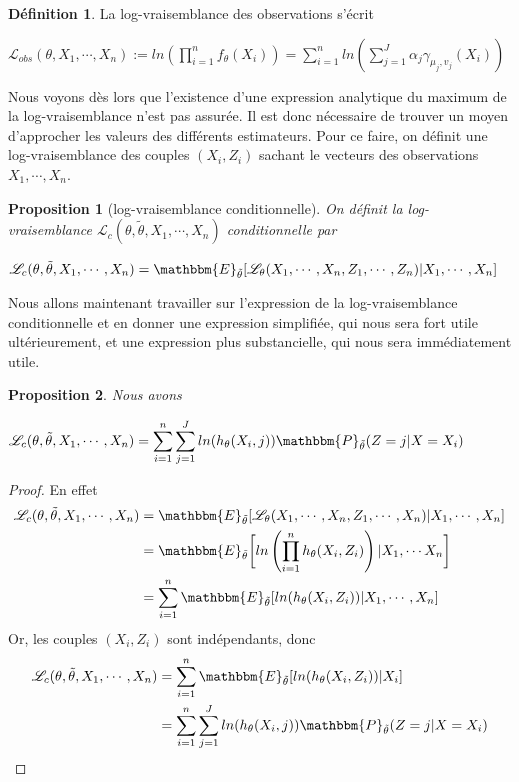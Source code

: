 \documentclass[frenchb]{report}
\newcommand{\1}{\mathbbm{1}}
\newcommand{\E}{\mathbbm{E}}
\newcommand{\prob}{\mathbbm{P}}
\newcommand{\lv}{\mathcal{L}}
\newcommand{\thetat}{\tilde{\theta}}
\newtheorem{prop}{Proposition}
\theoremstyle{definition}\newtheorem{defn}{Définition}
\theoremstyle{definition}\newtheorem{exm}{Exemple}
\theoremstyle{definition}\newtheorem{nota}{Notation}
\theoremstyle{definition}\newtheorem{rem}{Remarque}
\begin{document}
\begin{defn} 
La log-vraisemblance des observations s'écrit 
\begin{center} $\mathcal{L}_{obs}(\theta, X_1, \cdots, X_n) := ln\left( \displaystyle\prod_{i=1}^n f_\theta(X_i) \right) = \displaystyle\sum_{i=1}^nln\left( \sum_{j=1}^J \alpha_j \gamma_{\mu_j, v_j}(X_i) \right)$ \end{center}
\end{defn}

Nous voyons dès lors que l'existence d'une expression analytique du maximum de la log-vraisemblance n'est pas assurée. Il est donc nécessaire de trouver un moyen d'approcher les valeurs des différents estimateurs. \newline
Pour ce faire, on définit une log-vraisemblance des couples $(X_i,Z_i)$ sachant le vecteurs des observations $X_1, \cdots, X_n$.
\begin{prop}[log-vraisemblance conditionnelle]
On définit la log-vraisemblance $\lv_{c}(\theta, \thetat, X_1, \cdots, X_n) $ conditionnelle par
\begin{center} $\lv_{c}(\theta, \thetat, X_1, \cdots, X_n) = \E_{\thetat}[\lv_\theta(X_1, \cdots, X_n, Z_1, \cdots, Z_n) | X_1, \cdots, X_n]$ \end{center}
\end{prop}

Nous allons maintenant travailler sur l'expression de la log-vraisemblance conditionnelle et en donner une expression simplifiée, qui nous sera fort utile ultérieurement, et une expression plus substancielle, qui nous sera immédiatement utile.

\begin{prop}
Nous avons
\begin{center} $\lv_{c}(\theta, \thetat, X_1, \cdots, X_n) = \displaystyle\sum_{i=1}^n\sum_{j=1}^J ln(h_\theta(X_i ,j))  \prob_{\thetat}(Z = j|X = X_i)$ \end{center}
\end{prop}

\begin{proof}
En effet
\begin{align*}
\lv_{c}(\theta, \thetat, X_1, \cdots, X_n) &= \E_{\thetat}[\lv_\theta(X_1, \cdots, X_n, Z_1, \cdots, X_n)|X_1, \cdots, X_n]\\
&=  \E_{\thetat}\bigg[\displaystyle ln\left(\prod_{i=1}^n  h_\theta(X_i,Z_i)\right) |X_1, \cdots X_n \bigg]\\
&= \displaystyle\sum_{i=1}^n  \E_{\thetat}[ln(h_\theta(X_i,Z_i))|X_1, \cdots, X_n]\\
\end{align*}
Or, les couples $(X_i,Z_i)$ sont indépendants, donc
\begin{align*}
\lv_{c}(\theta, \thetat, X_1, \cdots, X_n) &= \displaystyle\sum_{i=1}^n  \E_{\thetat}[ln(h_\theta(X_i,Z_i))|X_i ]\\
&= \displaystyle\sum_{i=1}^n \sum_{j = 1}^J ln(h_\theta(X_i,j)) \prob_{\thetat} (Z = j|X = X_i)\\
\end{align*}
\end{proof}
\end{document}
